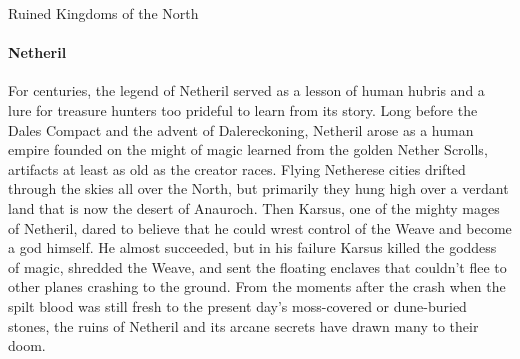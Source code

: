 \documentclass[10pt,a4paper,twoside,twocolumn,openany,bg=print,nodeprecatedcode]{dndbook}
\begin{document}
\begin{DndComment}{Ruined Kingdoms of the North}
\paragraph{Netheril}
For centuries, the legend of Netheril served as a lesson of human hubris and a lure for treasure hunters too prideful to learn from its story. Long before the Dales Compact and the advent of Dalereckoning, Netheril arose as a human empire founded on the might of magic learned from the golden Nether Scrolls, artifacts at least as old as the creator races. Flying Netherese cities drifted through the skies all over the North, but primarily they hung high over a verdant land that is now the desert of Anauroch.
Then Karsus, one of the mighty mages of Netheril, dared to believe that he could wrest control of the Weave and become a god himself. He almost succeeded, but in his failure Karsus killed the goddess of magic, shredded the Weave, and sent the floating enclaves that couldn't flee to other planes crashing to the ground. From the moments after the crash when the spilt blood was still fresh to the present day's moss-covered or dune-buried stones, the ruins of Netheril and its arcane secrets have drawn many to their doom.
\end{DndComment}
\end{document}
